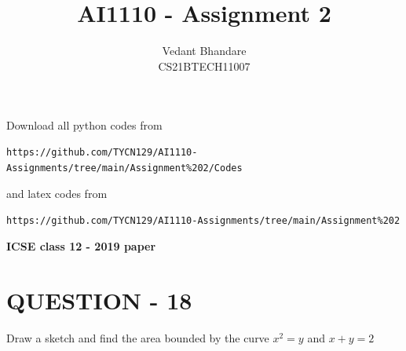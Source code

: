 \documentclass[journal,12pt,twocolumn]{IEEEtran}
\begin{document}
\raggedbottom
\setlength{\parindent}{0pt}
\vspace{3cm}
\title{AI1110 - Assignment 2}
\author{Vedant Bhandare\\CS21BTECH11007}
\maketitle
\newpage
\bigskip
\renewcommand{\thefigure}{\theenumi}
\renewcommand{\thetable}{\theenumi}
\maketitle

Download all python codes from 
\begin{lstlisting}
https://github.com/TYCN129/AI1110-Assignments/tree/main/Assignment%202/Codes
\end{lstlisting}
%
and latex codes from 
%
\begin{lstlisting}
https://github.com/TYCN129/AI1110-Assignments/tree/main/Assignment%202
\end{lstlisting}
\textbf{ICSE class 12 - 2019 paper}

\section{\textbf{QUESTION - 18}}
Draw a sketch and find the area bounded by the curve $x^2 = y$ and $x + y = 2$
\end{document}
